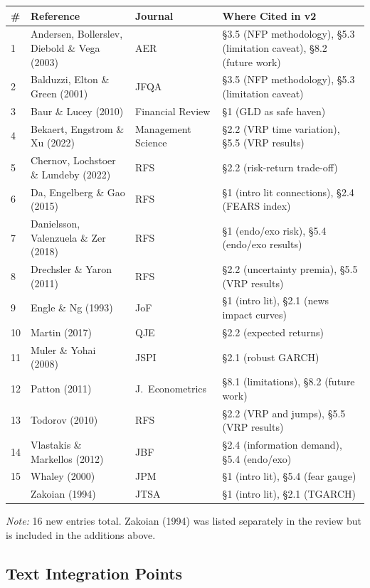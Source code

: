 \documentclass[12pt,a4paper]{article}
\begin{document}
\begin{longtable}{p{0.5cm}p{5cm}p{3cm}p{5.5cm}}
\toprule
\textbf{\#} & \textbf{Reference} & \textbf{Journal} & \textbf{Where Cited in v2} \\
\midrule
\endhead
1 & Andersen, Bollerslev, Diebold \& Vega (2003) & AER & \S3.5 (NFP methodology), \S5.3 (limitation caveat), \S8.2 (future work) \\
2 & Balduzzi, Elton \& Green (2001) & JFQA & \S3.5 (NFP methodology), \S5.3 (limitation caveat) \\
3 & Baur \& Lucey (2010) & Financial Review & \S1 (GLD as safe haven) \\
4 & Bekaert, Engstrom \& Xu (2022) & Management Science & \S2.2 (VRP time variation), \S5.5 (VRP results) \\
5 & Chernov, Lochstoer \& Lundeby (2022) & RFS & \S2.2 (risk-return trade-off) \\
6 & Da, Engelberg \& Gao (2015) & RFS & \S1 (intro lit connections), \S2.4 (FEARS index) \\
7 & Danielsson, Valenzuela \& Zer (2018) & RFS & \S1 (endo/exo risk), \S5.4 (endo/exo results) \\
8 & Drechsler \& Yaron (2011) & RFS & \S2.2 (uncertainty premia), \S5.5 (VRP results) \\
9 & Engle \& Ng (1993) & JoF & \S1 (intro lit), \S2.1 (news impact curves) \\
10 & Martin (2017) & QJE & \S2.2 (expected returns) \\
11 & Muler \& Yohai (2008) & JSPI & \S2.1 (robust GARCH) \\
12 & Patton (2011) & J.\ Econometrics & \S8.1 (limitations), \S8.2 (future work) \\
13 & Todorov (2010) & RFS & \S2.2 (VRP and jumps), \S5.5 (VRP results) \\
14 & Vlastakis \& Markellos (2012) & JBF & \S2.4 (information demand), \S5.4 (endo/exo) \\
15 & Whaley (2000) & JPM & \S1 (intro lit), \S5.4 (fear gauge) \\
\addlinespace
& Zakoian (1994) & JTSA & \S1 (intro lit), \S2.1 (TGARCH) \\
\bottomrule
\end{longtable}

\textit{Note:} 16 new entries total. Zakoian (1994) was listed separately in the review but is included in the additions above.

\subsection*{Text Integration Points}
\end{document}

